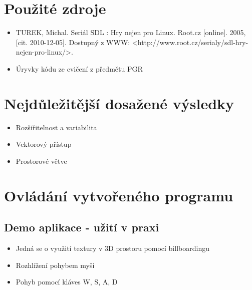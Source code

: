 \documentclass[11pt,a4paper]{article}
\begin{document}
\section{Použité zdroje}

%

\begin{itemize}
\item TUREK, Michal. Seriál SDL : Hry nejen pro Linux. Root.cz [online]. 2005, [cit. 2010-12-05]. Dostupný z WWW: {\textless}http://www.root.cz/serialy/sdl-hry-nejen-pro-linux/{\textgreater}.
\item Úryvky kódu ze cvičení z předmětu PGR
\end{itemize}

\section{Nejdůležitější dosažené výsledky}


\begin{itemize}
\item Rozšiřitelnost a variabilita
\item Vektorový přístup
\item Prostorové větve
\end{itemize}

\section{Ovládání vytvořeného programu}

%

\subsection{Demo aplikace - užití v praxi}
\begin{itemize}
\item Jedná se o využití textury v 3D prostoru pomocí billboardingu
\item Rozhlížení pohybem myši
\item Pohyb pomocí kláves W, S, A, D
\end{itemize}
\end{document}
